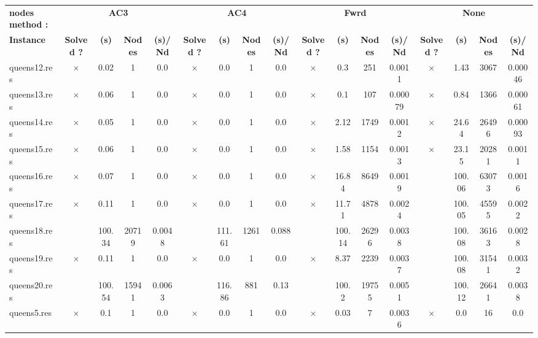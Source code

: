 \documentclass[main.tex]{subfiles}
\begin{document}
\begin{landscape}
\begin{center}
\renewcommand{\arraystretch}{1.4} 
\begin{tabular}{|l|cccc|cccc|cccc|cccc|}
	\hline
\textbf{nodes method :} & \multicolumn{4}{c}{\textbf{AC3}} & \multicolumn{4}{c}{\textbf{AC4}} & \multicolumn{4}{c}{\textbf{Fwrd}} & \multicolumn{4}{c}{\textbf{None}}\\
\textbf{Instance}  & \textbf{Solved ?} & \textbf{(s)} & \textbf{Nodes} & \textbf{(s)/Nd} & \textbf{Solved ?} & \textbf{(s)} & \textbf{Nodes} & \textbf{(s)/Nd} & \textbf{Solved ?} & \textbf{(s)} & \textbf{Nodes} & \textbf{(s)/Nd} & \textbf{Solved ?} & \textbf{(s)} & \textbf{Nodes} & \textbf{(s)/Nd}\\\hline

queens12.res & $\times$ & 0.02 & 1 & 0.0
 & $\times$ & 0.0 & 1 & 0.0
 & $\times$ & 0.3 & 251 & 0.0011
 & $\times$ & 1.43 & 3067 & 0.00046
\\
queens13.res & $\times$ & 0.06 & 1 & 0.0
 & $\times$ & 0.0 & 1 & 0.0
 & $\times$ & 0.1 & 107 & 0.00079
 & $\times$ & 0.84 & 1366 & 0.00061
\\
queens14.res & $\times$ & 0.05 & 1 & 0.0
 & $\times$ & 0.0 & 1 & 0.0
 & $\times$ & 2.12 & 1749 & 0.0012
 & $\times$ & 24.64 & 26496 & 0.00093
\\
queens15.res & $\times$ & 0.06 & 1 & 0.0
 & $\times$ & 0.0 & 1 & 0.0
 & $\times$ & 1.58 & 1154 & 0.0013
 & $\times$ & 23.15 & 20281 & 0.0011
\\
queens16.res & $\times$ & 0.07 & 1 & 0.0
 & $\times$ & 0.0 & 1 & 0.0
 & $\times$ & 16.84 & 8649 & 0.0019
 &  & 100.06 & 63073 & 0.0016
\\
queens17.res & $\times$ & 0.11 & 1 & 0.0
 & $\times$ & 0.0 & 1 & 0.0
 & $\times$ & 11.71 & 4878 & 0.0024
 &  & 100.05 & 45595 & 0.0022
\\
queens18.res &  & 100.34 & 20719 & 0.0048
 &  & 111.61 & 1261 & 0.088
 &  & 100.14 & 26296 & 0.0038
 &  & 100.08 & 36163 & 0.0028
\\
queens19.res & $\times$ & 0.11 & 1 & 0.0
 & $\times$ & 0.0 & 1 & 0.0
 & $\times$ & 8.37 & 2239 & 0.0037
 &  & 100.08 & 31541 & 0.0032
\\
queens20.res &  & 100.54 & 15941 & 0.0063
 &  & 116.86 & 881 & 0.13
 &  & 100.2 & 19755 & 0.0051
 &  & 100.12 & 26641 & 0.0038
\\
queens5.res & $\times$ & 0.1 & 1 & 0.0
 & $\times$ & 0.0 & 1 & 0.0
 & $\times$ & 0.03 & 7 & 0.0036
 & $\times$ & 0.0 & 16 & 0.0
\\

\end{tabular}
\end{center}
\end{landscape}
\end{document}
